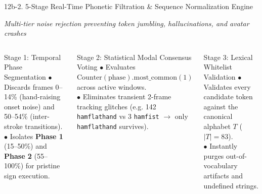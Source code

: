 \documentclass[aspectratio=169]{beamer}
\begin{document}
\begin{frame}[t]{12b-2. 5-Stage Real-Time Phonetic Filtration \& Sequence Normalization Engine}
\vspace{-0.1cm}
\begin{center}
    \scriptsize\textit{\textcolor{amritaMaroon}{Multi-tier noise rejection preventing token jumbling, hallucinations, and avatar crashes}}
\end{center}

\vspace{-1.5mm}
\begin{columns}[T]
    \begin{block}{Stage 1: Temporal Phase Segmentation}
        \fontsize{6.6pt}{8.4pt}\selectfont
        $\bullet$ Discards frames 0--14\% (hand-raising onset noise) and 50--54\% (inter-stroke transitions).\\
        $\bullet$ Isolates \textbf{Phase 1} (15--50\%) and \textbf{Phase 2} (55--100\%) for pristine sign execution.
    \end{block}

    \begin{block}{Stage 2: Statistical Modal Consensus Voting}
        \fontsize{6.6pt}{8.4pt}\selectfont
        $\bullet$ Evaluates $\text{Counter}(\text{phase}).\text{most\_common}(1)$ across active windows.\\
        $\bullet$ Eliminates transient 2-frame tracking glitches (e.g. 142 \texttt{hamflathand} vs 3 \texttt{hamfist} $\to$ only \texttt{hamflathand} survives).
    \end{block}

    \begin{block}{Stage 3: Lexical Whitelist Validation}
        \fontsize{6.6pt}{8.4pt}\selectfont
        $\bullet$ Validates every candidate token against the canonical alphabet $T$ ($|T|=83$).\\
        $\bullet$ Instantly purges out-of-vocabulary artifacts and undefined strings.
    \end{block}


\end{columns}
\end{frame}
\end{document}
